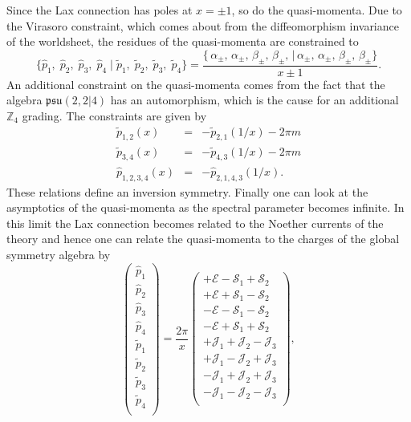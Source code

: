 Since the Lax connection has poles at $x = \pm 1$, so do the quasi-momenta. Due to the Virasoro constraint, which comes about from the diffeomorphism invariance of the worldsheet, the residues of the quasi-momenta are constrained to
\begin{equation}
	\{ \hat{p}_1, \; \hat{p}_2, \; \hat{p}_3, \; \hat{p}_4 \; | \; \tilde{p}_1, \; \tilde{p}_2, \; \tilde{p}_3, \; \tilde{p}_4 \} = \frac{\{ \, \alpha_{\pm}, \, \alpha_{\pm}, \, \beta_{\pm}, \, \beta_{\pm}, \, | \, \alpha_{\pm}, \, \alpha_{\pm}, \, \beta_{\pm}, \, \beta_{\pm} \}}{x \pm 1}.
\end{equation}
An additional constraint on the quasi-momenta comes from the fact that the algebra $\mathfrak{psu(2,2|4)}$ has an automorphism, which is the cause for an additional $\mathbb{Z}_4$ grading. The constraints are given by \cite{sakura}
\begin{eqnarray}
	\tilde{p}_{1,2}(x) & = & -\tilde{p}_{2,1}(1/x) - 2 \pi m \nonumber \\
	\tilde{p}_{3,4}(x) & = & -\tilde{p}_{4,3}(1/x) - 2 \pi m \nonumber \\
	\hat{p}_{1,2,3,4}(x) & = & -\hat{p}_{2,1,4,3}(1/x).
\end{eqnarray}
These relations define an inversion symmetry. Finally one can look at the asymptotics of the quasi-momenta as the spectral parameter becomes infinite. In this limit the Lax connection becomes related to the Noether currents of the theory and hence one can relate the quasi-momenta to the charges of the global symmetry algebra by \cite{algebraic_curve}
\begin{equation}
\left(
\begin{array}{c}
  \hat{p}_1 \\
  \hat{p}_2 \\
  \hat{p}_3 \\
  \hat{p}_4 \\
  \hline
  \tilde{p}_1 \\
  \tilde{p}_2 \\
  \tilde{p}_3 \\
  \tilde{p}_4 \\
\end{array}
\right) = \frac{2 \pi}{x}
\left(
\begin{array}{c}
  + \mathcal{E} - \mathcal{S}_1 + \mathcal{S}_2 \\
  + \mathcal{E} + \mathcal{S}_1 - \mathcal{S}_2 \\
  - \mathcal{E} - \mathcal{S}_1 - \mathcal{S}_2 \\
  - \mathcal{E} + \mathcal{S}_1 + \mathcal{S}_2 \\
  \hline
  + \mathcal{J}_1 + \mathcal{J}_2 - \mathcal{J}_3 \\
  + \mathcal{J}_1 - \mathcal{J}_2 + \mathcal{J}_3 \\
  - \mathcal{J}_1 + \mathcal{J}_2 + \mathcal{J}_3 \\
  - \mathcal{J}_1 - \mathcal{J}_2 - \mathcal{J}_3 \\
\end{array}
\right),
\label{eq:asymptotics}
\end{equation}
